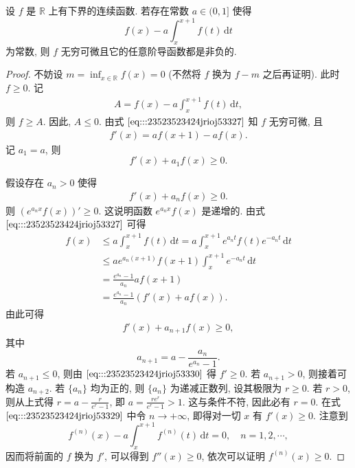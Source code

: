 \documentclass[../../main.tex]{subfiles}%
\begin{document}
\begin{example}
设 \( f \) 是 \( \mathbb{R} \) 上有下界的连续函数. 若存在常数 \( a \in (0,1] \) 使得  
\[
f(x) - a \int_{x}^{x + 1} f(t) \, \mathrm{d}t
\]  
为常数, 则 \( f \) 无穷可微且它的任意阶导函数都是非负的.  
\end{example}
\begin{proof}
不妨设 \( m = \inf_{x \in \mathbb{R}} f(x) = 0 \) (不然将 \( f \) 换为 \( f - m \) 之后再证明). 此时 \( f \geqslant 0 \). 记  
\begin{align}
A = f(x) - a \int_{x}^{x + 1} f(t) \, \mathrm{d}t, \label{eq:::23523523424jrioj53327}
\end{align}
则 \( f \geqslant A \). 因此, \( A \leqslant 0 \). 由式 \(\eqref{eq:::23523523424jrioj53327}\) 知 \( f \) 无穷可微, 且  
\begin{align}
f'(x) = a f(x + 1) - a f(x). \label{eq:::23523523424jrioj53328}
\end{align}  
记 \( a_1 = a \), 则  
\[
f'(x) + a_1 f(x) \geqslant 0.
\]  

假设存在 \( a_n > 0 \) 使得  
\begin{align}
f'(x) + a_n f(x) \geqslant 0. \label{eq:::23523523424jrioj53329}
\end{align}  
则 \( (e^{a_n x} f(x))' \geqslant 0 \). 这说明函数 \( e^{a_n x} f(x) \) 是递增的. 由式 \(\eqref{eq:::23523523424jrioj53327}\) 可得  
\[
\begin{aligned}
f(x) &\leqslant a \int_{x}^{x + 1} f(t) \, \mathrm{d}t = a \int_{x}^{x + 1} e^{a_n t} f(t) e^{-a_n t} \, \mathrm{d}t \\
&\leqslant a e^{a_n (x + 1)} f(x + 1) \int_{x}^{x + 1} e^{-a_n t} \, \mathrm{d}t \\
&= \frac{e^{a_n} - 1}{a_n} a f(x + 1) \\
&= \frac{e^{a_n} - 1}{a_n} (f'(x) + a f(x)).
\end{aligned}
\]  
由此可得  
\begin{align}
f'(x) + a_{n + 1} f(x) \geqslant 0, \label{eq:::23523523424jrioj53330}
\end{align}  
其中  
\[
a_{n + 1} = a - \frac{a_n}{e^{a_n} - 1}.
\]  
若 \( a_{n + 1} \leqslant 0 \), 则由 \(\eqref{eq:::23523523424jrioj53330}\) 得 \( f' \geqslant 0 \). 若 \( a_{n + 1} > 0 \), 则接着可构造 \( a_{n + 2} \). 若 \( \{a_n\} \) 均为正的, 则 \( \{a_n\} \) 为递减正数列, 设其极限为 \( r \geqslant 0 \). 若 \( r > 0 \), 则从上式得 \( r = a - \frac{r}{e^r - 1} \), 即 \( a = \frac{r e^r}{e^r - 1} > 1 \). 这与条件不符, 因此必有 \( r = 0 \). 在式 \(\eqref{eq:::23523523424jrioj53329}\) 中令 \( n \to +\infty \), 即得对一切 \( x \) 有 \( f'(x) \geqslant 0 \). 注意到  
\[
f^{(n)}(x) - a \int_{x}^{x + 1} f^{(n)}(t) \, \mathrm{d}t = 0, \quad n = 1, 2, \cdots,
\]  
因而将前面的 \( f \) 换为 \( f' \), 可以得到 \( f''(x) \geqslant 0 \), 依次可以证明 \( f^{(n)}(x) \geqslant 0 \).
\end{proof}
\end{document}
